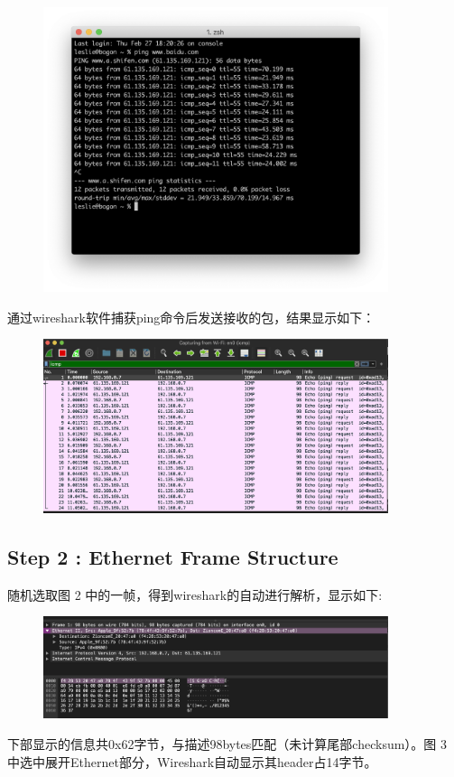 \documentclass{article}
\begin{document}
   \begin{figure}[H]
        \centering
        \includegraphics[width=0.9\textwidth]{img/exp12.png}
        \caption{}
        \label{fig.1}
    \end{figure}
    通过wireshark软件捕获ping命令后发送接收的包，结果显示如下：
    \begin{figure}[H]
        \centering
        \includegraphics[width=0.9\textwidth]{img/exp1.png}
        \caption{}
        \label{fig.2}
    \end{figure}
  
   
    \subsection{Step 2 : Ethernet Frame Structure}
   随机选取图 2 中的一帧，得到wireshark的自动进行解析，显示如下:
   
  \begin{figure}[H]
        \centering
        \includegraphics[width=0.9\textwidth]{img/exp123.png}
        \caption{}
        \label{fig.3}
    \end{figure}
  下部显示的信息共0x62字节，与描述98bytes匹配（未计算尾部checksum）。图 3 中选中展开Ethernet部分，Wireshark自动显示其header占14字节。
  
\end{document}
